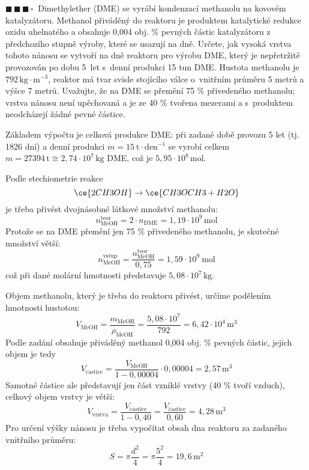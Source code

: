 \documentclass{book}
\newcommand{\tri}{$\blacksquare \, \blacksquare \, \blacksquare \, \square \; \; $}
\renewenvironment{quotation}{\par}{\par} %
\begin{document}
\hrulefill
\begin{quotation}
\tri Dimethylether (DME) se vyrábí kondenzací methanolu na kovovém katalyzátoru.
Methanol přiváděný do reaktoru je produktem katalytické redukce oxidu
uhelnatého a obsahuje 0,004 obj. \% pevných částic katalyzátoru z
předchozího stupně výroby, které se usazují na dně. Určete, jak vysoká
vrstva tohoto nánosu se vytvoří na dně reaktoru pro výrobu DME, který
je nepřetržitě provozován po dobu 5~let s~denní produkci 15 tun
DME. Hustota methanolu je $792\,\mathrm{kg\cdot m^{-3}}$, reaktor
má tvar svisle stojícího válce o~vnitřním průměru 5 metrů a výšce
7 metrů. Uvažujte, že na DME se přemění 75 \% přivedeného methanolu;
vrstva nánosu není upěchovaná a je ze 40 \% tvořena mezerami a s~produktem
neodcházejí žádné pevné částice.
\end{quotation} \dotfill \par 

Základem výpočtu je celková produkce DME: při zadané době provozu
5 let (tj. 1826 dní) a denní produkci $\dot{m}=15\ \mathrm{t\cdot den^{-1}}$
se vyrobí celkem $m=27394\,\mathrm{t}\cong2,74\cdot10^{7}\mathrm{\,kg}$
DME, což je $5,95\cdot10^{8}\,\mathrm{mol}$.

Podle stechiometrie reakce
\[
\ce{2CH3OH} \rightarrow \ce{CH3OCH3 + H2O}
\]
je třeba přivést dvojnásobné látkové množství methanolu:
\[
n_{\mathrm{MeOH}}^{\mathrm{teor}}=2\cdot n_{\mathrm{DME}}=1,19\cdot10^{9}\,\mathrm{mol}
\]
Protože se na DME přemění jen 75 \% přivedeného methanolu, je skutečné
množství větší: 
\[
n_{\mathrm{MeOH}}^{\mathrm{vstup}}=\frac{n_{\mathrm{MeOH}}^{\mathrm{teor}}}{0,75}=1,59\cdot10^{9}\:\mathrm{mol}
\]
což při dané molární hmotnosti představuje $5,08\cdot10^{7}\,\mathrm{kg}$.

Objem methanolu, který je třeba do reaktoru přivést, určíme podělením
hmotnosti hustotou: 
\[
V_{\mathrm{MeOH}}=\frac{m_{\mathrm{MeOH}}}{\rho_{\mathrm{MeOH}}}=\frac{5,08\cdot10^{7}}{792}=6,42\cdot10^{4}\,\mathrm{m}^{3}
\]
 Podle zadání obsahuje přiváděný methanol 0,004 obj. \% pevných částic,
jejich objem je tedy 
\[
V_{\mathrm{\check{c}\acute{a}stice}}=\frac{V_{\mathrm{MeOH}}}{1-0,00004}\cdot0,00004=2,57\, \mathrm{m^{3}}
\]
Samotné částice ale představují jen část vzniklé vrstvy (40 \% tvoří
vzduch), celkový objem vrstvy je větší: 
\[
V_{\mathrm{vrstva}}=\frac{V_{\mathrm{\check{c}\acute{a}stice}}}{1-0,40}=\frac{V_{\mathrm{\check{c}\acute{a}stice}}}{0,60}=4,28\,\mathrm{m^{3}}
\]
Pro určení výšky nánosu je třeba vypočítat obsah dna reaktoru za
zadaného vnitřního průměru: 
\[
S=\pi\frac{d^{2}}{4}=\pi\frac{5^{2}}{4}=19,6\,\mathrm{m^{2}}
\]
\end{document}
